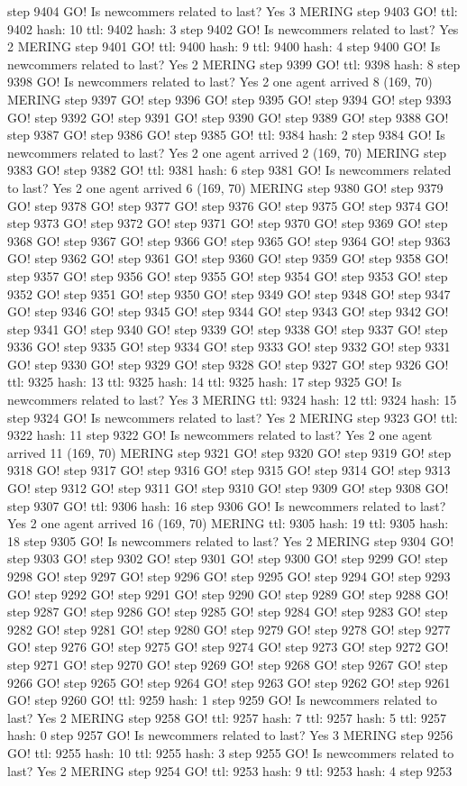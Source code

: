 step 9404 GO! Is newcommers related to last? Yes 3 MERING step 9403 GO! ttl: 9402 hash: 10 ttl: 9402 hash: 3 step 9402 GO! Is newcommers related to last? Yes 2 MERING step 9401 GO! ttl: 9400 hash: 9 ttl: 9400 hash: 4 step 9400 GO! Is newcommers related to last? Yes 2 MERING step 9399 GO! ttl: 9398 hash: 8 step 9398 GO! Is newcommers related to last? Yes 2 one agent arrived 8 (169, 70) MERING step 9397 GO! step 9396 GO! step 9395 GO! step 9394 GO! step 9393 GO! step 9392 GO! step 9391 GO! step 9390 GO! step 9389 GO! step 9388 GO! step 9387 GO! step 9386 GO! step 9385 GO! ttl: 9384 hash: 2 step 9384 GO! Is newcommers related to last? Yes 2 one agent arrived 2 (169, 70) MERING step 9383 GO! step 9382 GO! ttl: 9381 hash: 6 step 9381 GO! Is newcommers related to last? Yes 2 one agent arrived 6 (169, 70) MERING step 9380 GO! step 9379 GO! step 9378 GO! step 9377 GO! step 9376 GO! step 9375 GO! step 9374 GO! step 9373 GO! step 9372 GO! step 9371 GO! step 9370 GO! step 9369 GO! step 9368 GO! step 9367 GO! step 9366 GO! step 9365 GO! step 9364 GO! step 9363 GO! step 9362 GO! step 9361 GO! step 9360 GO! step 9359 GO! step 9358 GO! step 9357 GO! step 9356 GO! step 9355 GO! step 9354 GO! step 9353 GO! step 9352 GO! step 9351 GO! step 9350 GO! step 9349 GO! step 9348 GO! step 9347 GO! step 9346 GO! step 9345 GO! step 9344 GO! step 9343 GO! step 9342 GO! step 9341 GO! step 9340 GO! step 9339 GO! step 9338 GO! step 9337 GO! step 9336 GO! step 9335 GO! step 9334 GO! step 9333 GO! step 9332 GO! step 9331 GO! step 9330 GO! step 9329 GO! step 9328 GO! step 9327 GO! step 9326 GO! ttl: 9325 hash: 13 ttl: 9325 hash: 14 ttl: 9325 hash: 17 step 9325 GO! Is newcommers related to last? Yes 3 MERING ttl: 9324 hash: 12 ttl: 9324 hash: 15 step 9324 GO! Is newcommers related to last? Yes 2 MERING step 9323 GO! ttl: 9322 hash: 11 step 9322 GO! Is newcommers related to last? Yes 2 one agent arrived 11 (169, 70) MERING step 9321 GO! step 9320 GO! step 9319 GO! step 9318 GO! step 9317 GO! step 9316 GO! step 9315 GO! step 9314 GO! step 9313 GO! step 9312 GO! step 9311 GO! step 9310 GO! step 9309 GO! step 9308 GO! step 9307 GO! ttl: 9306 hash: 16 step 9306 GO! Is newcommers related to last? Yes 2 one agent arrived 16 (169, 70) MERING ttl: 9305 hash: 19 ttl: 9305 hash: 18 step 9305 GO! Is newcommers related to last? Yes 2 MERING step 9304 GO! step 9303 GO! step 9302 GO! step 9301 GO! step 9300 GO! step 9299 GO! step 9298 GO! step 9297 GO! step 9296 GO! step 9295 GO! step 9294 GO! step 9293 GO! step 9292 GO! step 9291 GO! step 9290 GO! step 9289 GO! step 9288 GO! step 9287 GO! step 9286 GO! step 9285 GO! step 9284 GO! step 9283 GO! step 9282 GO! step 9281 GO! step 9280 GO! step 9279 GO! step 9278 GO! step 9277 GO! step 9276 GO! step 9275 GO! step 9274 GO! step 9273 GO! step 9272 GO! step 9271 GO! step 9270 GO! step 9269 GO! step 9268 GO! step 9267 GO! step 9266 GO! step 9265 GO! step 9264 GO! step 9263 GO! step 9262 GO! step 9261 GO! step 9260 GO! ttl: 9259 hash: 1 step 9259 GO! Is newcommers related to last? Yes 2 MERING step 9258 GO! ttl: 9257 hash: 7 ttl: 9257 hash: 5 ttl: 9257 hash: 0 step 9257 GO! Is newcommers related to last? Yes 3 MERING step 9256 GO! ttl: 9255 hash: 10 ttl: 9255 hash: 3 step 9255 GO! Is newcommers related to last? Yes 2 MERING step 9254 GO! ttl: 9253 hash: 9 ttl: 9253 hash: 4 step 9253 